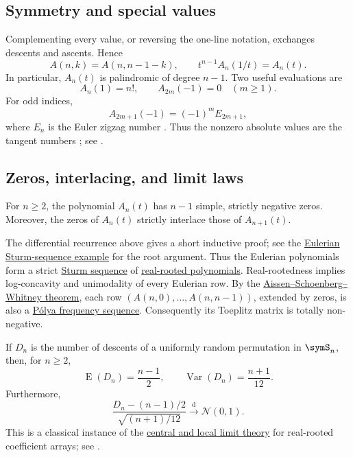\subsection[eulerianSymmetry]{Symmetry and special values}

Complementing every value, or reversing the one-line notation, exchanges
descents and ascents.  Hence
\begin{equation}
 A(n,k)=A(n,n-1-k),
 \qquad
 t^{n-1}A_n(1/t)=A_n(t).
\end{equation}
In particular, $A_n(t)$ is palindromic of degree $n-1$.  Two useful
evaluations are
\[
 A_n(1)=n!,
 \qquad
 A_{2m}(-1)=0 \quad(m\geq1).
\]
For odd indices,
\[
 A_{2m+1}(-1)=(-1)^m E_{2m+1},
\]
where $E_n$ is the Euler zigzag number .  Thus the nonzero
absolute values are the tangent numbers ; see
\cite[Ch.~5]{FoataSchutzenberger1970}.


\subsection[eulerianZeros]{Zeros, interlacing, and limit laws}

\begin{theorem}
For $n\geq2$, the polynomial $A_n(t)$ has $n-1$ simple, strictly negative
zeros.  Moreover, the zeros of $A_n(t)$ strictly interlace those of
$A_{n+1}(t)$.
\end{theorem}

The differential recurrence above gives a short inductive proof; see the
\hyperref[ex:eulerianSturm]{Eulerian Sturm-sequence example} for the root
argument.  Thus the Eulerian polynomials form a strict
\hyperref[sturmSequenceDefinition]{Sturm sequence} of
\hyperref[realRootedPolynomial]{real-rooted polynomials}.  Real-rootedness
implies log-concavity and unimodality of every Eulerian row.  By the
\hyperref[aissenSchoenbergWhitney]{Aissen--Schoenberg--Whitney theorem}, each
row $(A(n,0),\dotsc,A(n,n-1))$, extended by zeros, is also a
\hyperref[polyaFrequencySequenceDefinition]{Pólya frequency sequence}.
Consequently its Toeplitz matrix is totally non-negative.

If $D_n$ is the number of descents of a uniformly random permutation in
$\symS_n$, then, for $n\geq2$,
\[
 \operatorname{E}(D_n)=\frac{n-1}{2},
 \qquad
 \operatorname{Var}(D_n)=\frac{n+1}{12}.
\]
Furthermore,
\[
 \frac{D_n-(n-1)/2}{\sqrt{(n+1)/12}}
 \mathrel{\xrightarrow{\mathrm d}}\mathcal N(0,1).
\]
This is a classical instance of the
\hyperref[realRootedNormality]{central and local limit theory} for
real-rooted coefficient arrays; see \cite{Bender1973}.


